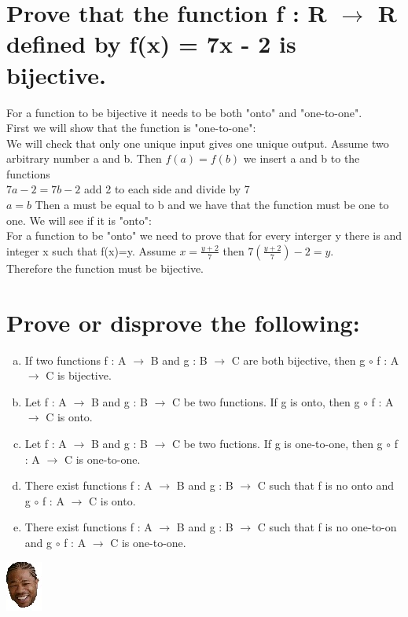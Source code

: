 \section{Prove that the function f : R $\rightarrow$ R defined by f(x) = 7x - 2 is bijective.}
For a function to be bijective it needs to be both "onto" and "one-to-one".\\
First we will show that the function is "one-to-one":\\
We will check that only one unique input gives one unique output. Assume two arbitrary number a and b. Then $f(a)=f(b)$ we insert a and b to the functions\\
$7a-2=7b-2$ add 2 to each side and divide by 7\\
$a=b$ Then a must be equal to b and we have that the function must be one to one.
We will see if it is "onto":\\
For a function to be "onto" we need to prove that for every interger y there is and integer x such that f(x)=y. Assume $x=\frac{y+2}{7}$ then $7(\frac{y+2}{7})-2=y$.\\
Therefore the function must be bijective.
\newpage
\section{Prove or disprove the following:}
\begin{enumerate}[a.]
\item If two functions f : A $\rightarrow$ B and g : B $\rightarrow$ C are both bijective, then g $\circ$ f : A $\rightarrow$ C is bijective.
\item Let f : A $\rightarrow$ B and g : B $\rightarrow$ C be two functions. If g is onto, then g $\circ$ f : A $\rightarrow$ C is onto.
\item Let f : A $\rightarrow$ B and g : B $\rightarrow$ C be two fuctions. If g is one-to-one, then g $\circ$ f : A $\rightarrow$ C is one-to-one.
\item There exist functions f : A $\rightarrow$ B and g : B $\rightarrow$ C such that f is no onto and g $\circ$ f : A $\rightarrow$ C is onto.
\item There exist functions f : A $\rightarrow$ B and g : B $\rightarrow$ C such that f is no one-to-on and g $\circ$ f : A $\rightarrow$ C is one-to-one.
\end{enumerate}
\includegraphics[scale=0.70]{billeder/xzibit}